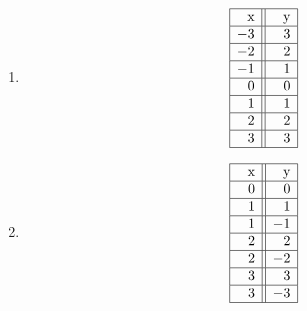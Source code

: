 \documentclass{ximera}
\begin{document}
\begin{multicols}{2}

\begin{enumerate}

\setcounter{enumi}{\value{HW}}

\item  \label{tablefirst} 

\[\begin{array}{|r||r|}  \hline

$x$  & \hphantom{\text{$-$}} $y$  \\ \hline
 -3 &  3 \\  \hline
 -2 & 2  \\  \hline
  -1 &  1  \\  \hline
 0 &  0 \\  \hline
 1 & 1  \\  \hline
 2 &  2 \\  \hline
 3 & 3  \\  \hline

\end{array}\]

\item \label{tablelast}

\[\begin{array}{|r||r|}  \hline

\hphantom{\text{$-$}} $x$  &$y$  \\ \hline

 0 & 0 \\  \hline
 1 & 1  \\  \hline
 1 & -1  \\  \hline
 2 &  2 \\  \hline
 2 & -2  \\  \hline
 3 &  3 \\  \hline
 3 & -3  \\  \hline

\end{array}\]

\setcounter{HW}{\value{enumi}}

\end{enumerate}

\end{multicols}
\end{document}
